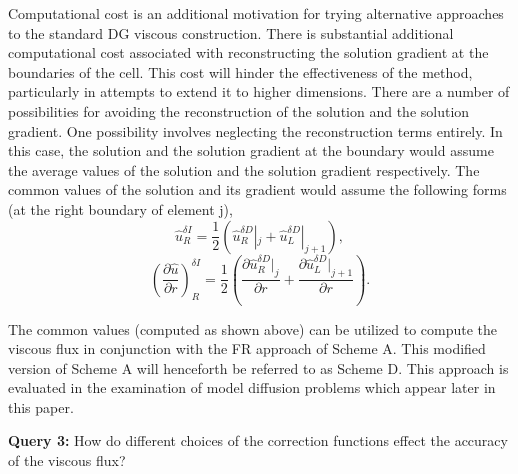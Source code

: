 \vspace{0.1 in}

\noindent Computational cost is an additional motivation for trying alternative approaches to the standard DG viscous construction. There is substantial additional computational cost associated with reconstructing the solution gradient at the boundaries of the cell. This cost will hinder the effectiveness of the method, particularly in attempts to extend it to higher dimensions. There are a number of possibilities for avoiding the reconstruction of the solution and the solution gradient. One possibility involves neglecting the reconstruction terms entirely. In this case, the solution and the solution gradient at the boundary would assume the average values of the solution and the solution gradient respectively. The common values of the solution and its gradient would assume the following forms (at the right boundary of element j),
%
\begin{equation}
\hat{u}^{\delta I}_R =  \frac {1}{2} \left ( \hat{u}^{\delta D}_R |_{j} + \hat{u}^{\delta D}_L |_{j+1}  \right),
\end{equation}
%
\begin{equation}
\left( \frac {\partial \hat{u}}{\partial r} \right)_{R}^{\delta I} =  \frac {1}{2} \left( \frac {\partial \hat{u}^{\delta D}_R |_{j}}{\partial r} +  \frac {\partial \hat{u}^{\delta D}_L |_{j+1}}{\partial r} \right) .
\end{equation}

\vspace{0.1in}
\noindent The common values (computed as shown above) can be utilized to compute the viscous flux in conjunction with the FR approach of Scheme A. This modified version of Scheme A will henceforth be referred to as Scheme D. This approach is evaluated in the examination of model diffusion problems which appear later in this paper.

\vspace{0.2 in}
\begin{raggedleft}
{\bf Query 3:} How do different choices of the correction functions effect the accuracy of the viscous flux?
\end{raggedleft}
\vspace{0.2 in}

